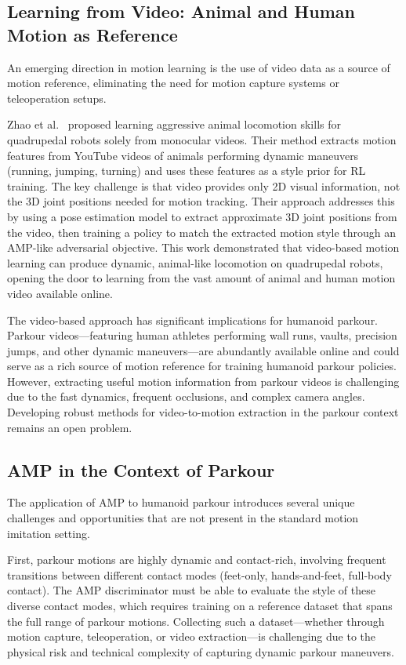 \subsection{Learning from Video: Animal and Human Motion as Reference}

An emerging direction in motion learning is the use of video data as a source of motion reference, eliminating the need for motion capture systems or teleoperation setups.

Zhao et al.~\cite{zhao2024aggressivelocomotion} proposed learning aggressive animal locomotion skills for quadrupedal robots solely from monocular videos. Their method extracts motion features from YouTube videos of animals performing dynamic maneuvers (running, jumping, turning) and uses these features as a style prior for RL training. The key challenge is that video provides only 2D visual information, not the 3D joint positions needed for motion tracking. Their approach addresses this by using a pose estimation model to extract approximate 3D joint positions from the video, then training a policy to match the extracted motion style through an AMP-like adversarial objective. This work demonstrated that video-based motion learning can produce dynamic, animal-like locomotion on quadrupedal robots, opening the door to learning from the vast amount of animal and human motion video available online.

The video-based approach has significant implications for humanoid parkour. Parkour videos---featuring human athletes performing wall runs, vaults, precision jumps, and other dynamic maneuvers---are abundantly available online and could serve as a rich source of motion reference for training humanoid parkour policies. However, extracting useful motion information from parkour videos is challenging due to the fast dynamics, frequent occlusions, and complex camera angles. Developing robust methods for video-to-motion extraction in the parkour context remains an open problem.

\subsection{AMP in the Context of Parkour}

The application of AMP to humanoid parkour introduces several unique challenges and opportunities that are not present in the standard motion imitation setting.

First, parkour motions are highly dynamic and contact-rich, involving frequent transitions between different contact modes (feet-only, hands-and-feet, full-body contact). The AMP discriminator must be able to evaluate the style of these diverse contact modes, which requires training on a reference dataset that spans the full range of parkour motions. Collecting such a dataset---whether through motion capture, teleoperation, or video extraction---is challenging due to the physical risk and technical complexity of capturing dynamic parkour maneuvers.

